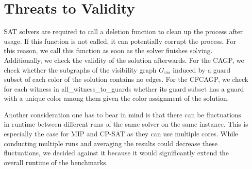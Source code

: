 \section{Threats to Validity}
SAT solvers are required to call a deletion function to clean up the process after usage. If this function is not called, it can potentially corrupt the process. For this reason, we call this function as soon as the solver finishes solving. Additionally, we check the validity of the solution afterwards. For the CAGP, we check whether the subgraphs of the visibility graph $G_{vis}$ induced by a guard subset of each color of the solution contains no edges. For the CFCAGP, we check for each witness in all\_witness\_to\_guards whether its guard subset has a guard with a unique color among them given the color assignment of the solution.

Another consideration one has to bear in mind is that there can be fluctuations in runtime between different runs of the same solver on the same instance. This is especially the case for MIP and CP-SAT as they can use multiple cores. While conducting multiple runs and averaging the results could decrease these fluctuations, we decided against it because it would significantly extend the overall runtime of the benchmarks.